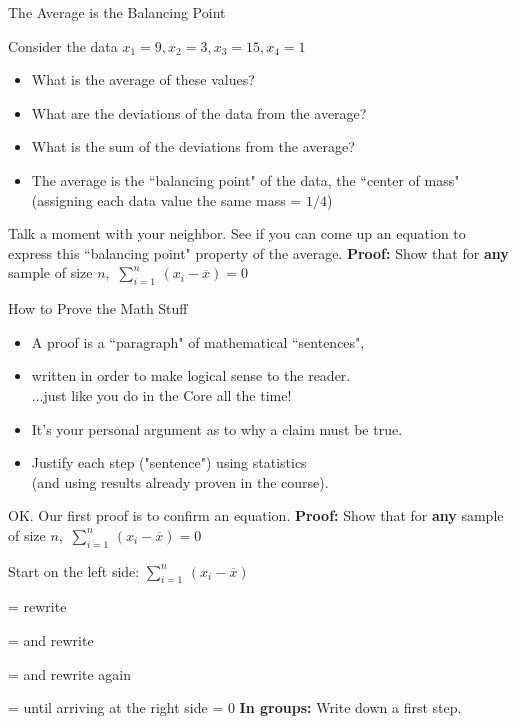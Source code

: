 \documentclass{beamer}\usepackage[]{graphicx}\usepackage[]{color}
\newcommand{\xbar}{\overline{x}}
\begin{document}
\begin{frame}[fragile]{The Average is the Balancing Point\;\;}
\vspace{0.25cm}

Consider the data $x_1=9, x_2=3, x_3=15, x_4=1$
\begin{itemize}
\item What is the average of these values?
\pause
\item What are the deviations of the data from the average?
\pause
\item What is the sum of the deviations from the average?
\pause
\item The average is the ``balancing point" of the data, the ``center of mass" (assigning each data value the same mass = $1/4$)
\end{itemize}
\vskip0.5cm
\pause
Talk a moment with your neighbor.  See if you can 
come up an equation to express this ``balancing point"
property of the average.
\vskip0.5cm
\pause
\textbf{Proof:} Show that for \textbf{any} sample of size $n,$
\;\;$\displaystyle{\sum_{i=1}^n\, (x_i-\overline{x}) = 0}$

\end{frame}
\begin{frame}{How to Prove the Math Stuff\;\;}
\vspace{0.25cm}

\begin{itemize}
\item
A proof is a ``paragraph"
of mathematical ``sentences",
\item
written in order to make logical sense to the reader.\\
...just like you do in the Core all the time!
\item
It's your personal argument as to why
a claim must be true.
\item
Justify each step ("sentence") using statistics\\
(and using results already proven in the course).
\end{itemize}

\newpage
OK. Our first proof is to confirm an equation.
\vskip0.5cm
\textbf{Proof:} Show that for \textbf{any} sample of size $n,$
\;\;$\displaystyle{\sum_{i=1}^n\, (x_i-\xbar) = 0}$
\vskip0.5cm

Start on the left side:\;\;
\;\;$\displaystyle{\sum_{i=1}^n\, (x_i-\xbar) }$

= rewrite

= and rewrite

= and rewrite again

= until arriving at the right side = 0
\vskip0.5cm
\textbf{In groups:} Write down a first step.


\end{frame}
\end{document}
